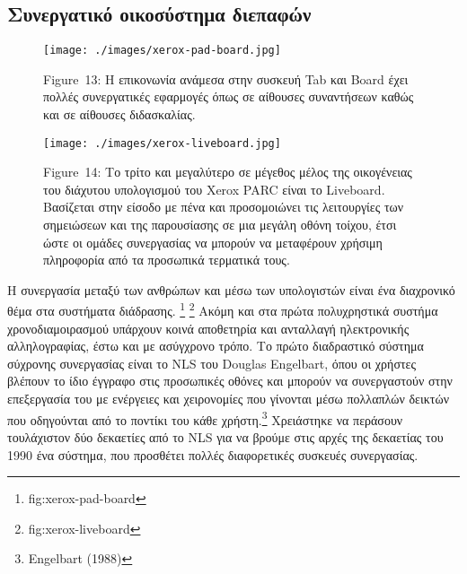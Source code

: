 \documentclass[
]{article}
\begin{document}
\hypertarget{ux3c3ux3c5ux3bdux3b5ux3c1ux3b3ux3b1ux3c4ux3b9ux3baux3cc-ux3bfux3b9ux3baux3bfux3c3ux3cdux3c3ux3c4ux3b7ux3bcux3b1-ux3b4ux3b9ux3b5ux3c0ux3b1ux3c6ux3ceux3bd}{%
\subsection{Συνεργατικό οικοσύστημα
διεπαφών}\label{ux3c3ux3c5ux3bdux3b5ux3c1ux3b3ux3b1ux3c4ux3b9ux3baux3cc-ux3bfux3b9ux3baux3bfux3c3ux3cdux3c3ux3c4ux3b7ux3bcux3b1-ux3b4ux3b9ux3b5ux3c0ux3b1ux3c6ux3ceux3bd}}

\leavevmode{}%
\begin{figure}
\hypertarget{fig:xerox-pad-board}{%
\centering
\texttt{[image: ./images/xerox-pad-board.jpg]}
\caption{Figure~13: Η επικονωνία ανάμεσα στην συσκευή Tab και Board έχει
πολλές συνεργατικές εφαρμογές όπως σε αίθουσες συναντήσεων καθώς και σε
αίθουσες διδασκαλίας.}\label{fig:xerox-pad-board}
}
\end{figure}

\leavevmode{}%
\begin{figure}
\hypertarget{fig:xerox-liveboard}{%
\centering
\texttt{[image: ./images/xerox-liveboard.jpg]}
\caption{Figure~14: Το τρίτο και μεγαλύτερο σε μέγεθος μέλος της
οικογένειας του διάχυτου υπολογισμού του Xerox PARC είναι το Liveboard.
Βασίζεται στην είσοδο με πένα και προσομοιώνει τις λειτουργίες των
σημειώσεων και της παρουσίασης σε μια μεγάλη οθόνη τοίχου, έτσι ώστε οι
ομάδες συνεργασίας να μπορούν να μεταφέρουν χρήσιμη πληροφορία από τα
προσωπικά τερματικά τους.}\label{fig:xerox-liveboard}
}
\end{figure}

Η συνεργασία μεταξύ των ανθρώπων και μέσω των υπολογιστών είναι ένα
διαχρονικό θέμα στα συστήματα διάδρασης. \footnote{fig:xerox-pad-board}
\footnote{fig:xerox-liveboard} Ακόμη και στα πρώτα πολυχρηστικά συστήμα
χρονοδιαμοιρασμού υπάρχουν κοινά αποθετηρία και ανταλλαγή ηλεκτρονικής
αλληλογραφίας, έστω και με ασύγχρονο τρόπο. Το πρώτο διαδραστικό σύστημα
σύχρονης συνεργασίας είναι το NLS του Douglas Engelbart, όπου οι χρήστες
βλέπουν το ίδιο έγγραφο στις προσωπικές οθόνες και μπορούν να
συνεργαστούν στην επεξεργασία του με ενέργειες και χειρονομίες που
γίνονται μέσω πολλαπλών δεικτών που οδηγούνται από το ποντίκι του κάθε
χρήστη.\footnote{Engelbart (1988)} Χρειάστηκε να περάσουν τουλάχιστον
δύο δεκαετίες από το NLS για να βρούμε στις αρχές της δεκαετίας του 1990
ένα σύστημα, που προσθέτει πολλές διαφορετικές συσκευές συνεργασίας.
\end{document}
